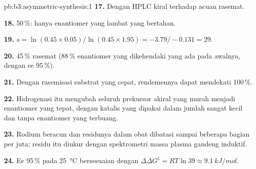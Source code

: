 \begin{solution}{pb:b3:asymmetric-synthesis:1}
\textbf{17.} Dengan HPLC kiral terhadap acuan rasemat.

\textbf{18.} 50\,\%: hanya enantiomer yang lambat yang bertahan.

\textbf{19.} $s = \ln(0.45 \times 0.05)/\ln(0.45 \times 1.95) = -3.79/-0.131 = 29$.

\textbf{20.} 45\,\% rasemat (88\,\% enantiomer yang dikehendaki yang ada pada awalnya,
dengan ee 95\,\%).

\textbf{21.} Dengan rasemisasi substrat yang cepat, rendemennya dapat mendekati 100\,\%.

\textbf{22.} Hidrogenasi itu mengubah seluruh prekursor akiral yang murah menjadi enantiomer yang tepat,
dengan katalis yang dipakai dalam jumlah sangat kecil dan tanpa enantiomer yang terbuang.

\textbf{23.} Rodium beracun dan residunya dalam obat dibatasi sampai beberapa bagian per
juta; residu itu diukur dengan spektrometri massa plasma gandeng induktif.

\textbf{24.} Ee 95\,\% pada \qty{25}{\celsius} bersesuaian dengan $\Delta\Delta G^\ddagger = RT\ln 39 \approx \qty{9.1}{kJ/mol}$.
\end{solution}
